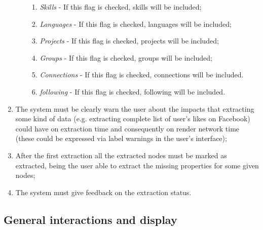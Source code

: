 \begin{enumerate}
\begin{enumerate}
\begin{enumerate}
            \item \textit{Skills} - If this flag is checked, skills will be included;
            \item \textit{Languages} - If this flag is checked, languages will be included;
            \item \textit{Projects} - If this flag is checked, projects will be included;
            \item \textit{Groups} - If this flag is checked, groups will be included;
            \item \textit{Connections} - If this flag is checked, connections will be included.
            \item \textit{following} - If this flag is checked, following will be included.
        \end{enumerate}
    \end{enumerate}
    \item The system must be clearly warn the user about the impacts that extracting some kind of data (e.g. extracting complete list of user's likes on Facebook)
    could have on extraction time and consequently on render network time (these could be expressed via label warnings in the user's interface);
    \item After the first extraction all the extracted nodes must be marked as extracted, being the user able to extract the missing properties for some given nodes;
    \item The system must give feedback on the extraction status.
\end{enumerate}

\subsection{General interactions and display}

